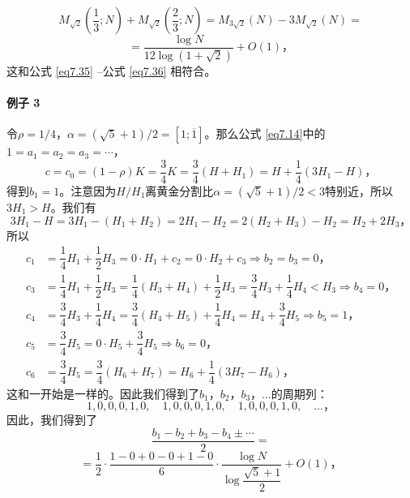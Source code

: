 \documentclass[11pt,a4paper]{article}
\theoremstyle{definition}
\newcommand{\refeq}[1]{公式 \ref{#1}}
\numberwithin{equation}{section}
\newcommand{\comma}{\text{，}}
\newcommand{\erfenzy}{\dfrac{1}{2}}
\begin{document}
\[ M_{\sqrt{2}}\left(\dfrac{1}{3};N\right)
+ M_{\sqrt{2}}\left(\dfrac{2}{3};N\right)=
M_{3\sqrt{2}}\left(N\right)-3M_{\sqrt{2}}\left(N\right)= \]
\[ =\dfrac{\log N}{12\log(1+\sqrt{2})}+O(1)\comma\]
这和\refeq{eq7.35} --\refeq{eq7.36} 相符合。

\paragraph{例子 3}
令$ \rho=1/4\comma\alpha=(\sqrt{5}+1)/2=\left[1;\overline{1}\right] $。那么\refeq{eq7.14}中的$ 1=a_{1}=a_{2}=a_{3}=\cdots $，
\begin{equation}\label{eq7.40}
 c=c_{0}=\left(1-\rho\right)K=\dfrac{3}{4}K=\dfrac{3}{4}\left(H+H_{1}\right)=H+\dfrac{1}{4}\left(3H_{1}-H\right)\comma 
\end{equation}
得到$ b_{1}=1 $。注意因为$ H/H_{1} $离黄金分割比$ \alpha=(\sqrt{5}+1)/2<3 $特别近，所以$ 3H_{1}>H $。我们有
\begin{equation}\label{eq7.41}
3H_{1}-H=3H_{1}-\left(H_{1}+H_{2}\right)=2H_{1}-H_{2}=2\left(H_{2}+H_{3}\right)-H_{2}=H_{2}+2H_{3}\comma
\end{equation}
所以
\begin{equation*}
 \begin{split}
 c_{1}&=\dfrac{1}{4}H_{1}+\dfrac{1}{2}H_{3}=0\cdot H_{1}+c_{2}=0\cdot H_{2}+c_{3} \Rightarrow b_{2}=b_{3}=0\comma
 \\	c_{3}&=\dfrac{1}{4}H_{1}+\dfrac{1}{2}H_{3}=\dfrac{1}{4}\left(H_{3}+H_{4}\right)+\dfrac{1}{2}H_{3}=\dfrac{3}{4}H_{3}+\dfrac{1}{4}H_{4}<H_{3} \Rightarrow b_{4}=0\comma
 \\	c_{4}&=\dfrac{3}{4}H_{3}+\dfrac{1}{4}H_{4}=\dfrac{3}{4}\left(H_{4}+H_{5}\right)+\dfrac{1}{4}H_{4}=H_{4}+\dfrac{3}{4}H_{5} \Rightarrow b_{5}=1\comma
 \\	c_{5}&=\dfrac{3}{4}H_{5}=0\cdot H_{5}+\dfrac{3}{4}H_{5} \Rightarrow b_{6}=0\comma
 \\	c_{6}&=\dfrac{3}{4}H_{5}=\dfrac{3}{4}\left(H_{6}+H_{7}\right)=H_{6}+\dfrac{1}{4}\left(3H_{7}-H_{6}\right) \comma
 \end{split}
 \end{equation*} 
 这和一开始是一样的。因此我们得到了$ b_{1}\comma b_{2}\comma b_{3}\comma\ldots$的周期列：
 \[ 1,0,0,0,1,0,\quad1,0,0,0,1,0,\quad1,0,0,0,1,0,\quad\ldots\comma \]
 因此，我们得到了
 \[ \dfrac{b_{1}- b_{2}+b_{3}-b_{4}\pm\cdots}{2}= \]
 \begin{equation}\label{eq7.42}
 =\erfenzy\cdot\dfrac{1-0+0-0+1-0}{6}\cdot\dfrac{\log N}{\log\dfrac{\sqrt{5}+1}{2}}+O(1)\comma
 \end{equation}
\end{document}
